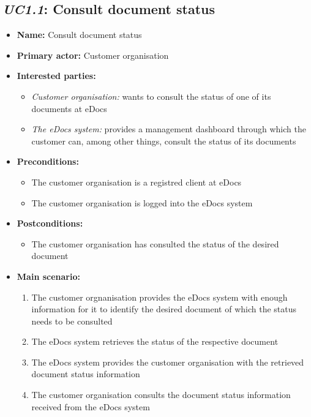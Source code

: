 \documentclass[a4paper,10pt]{article}
\begin{document}
\subsection{\emph{UC1.1}: Consult document status}
\begin{itemize}
    \item \textbf{Name:} Consult document status
    \item \textbf{Primary actor:} Customer organisation
    \item \textbf{Interested parties:} 
        \begin{itemize}
            \item \textit{Customer organisation:} wants to consult the status of one of its documents at eDocs
            \item \textit{The eDocs system:} provides a management dashboard through which the customer can, among other things, consult the status of its documents
        \end{itemize}

    \item \textbf{Preconditions:}
        \begin{itemize}
            \item The customer organisation is a registred client at eDocs
            \item The customer organisation is logged into the eDocs system
        \end{itemize}

    \item \textbf{Postconditions:}
        \begin{itemize}
            \item The customer organisation has consulted the status of the desired document
        \end{itemize}
        
    \item \textbf{Main scenario:} 
    \begin{enumerate}
       \item The customer orgnanisation provides the eDocs system with enough information for it to identify the desired document of which the status needs to be consulted
       \item The eDocs system retrieves the status of the respective document
       \item The eDocs system provides the customer organisation with the retrieved document status information
       \item The customer organisation consults the document status information received from the eDocs system
    \end{enumerate}
\end{itemize}
\end{document}
